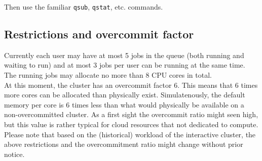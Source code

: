 \begin{prompt}
\end{prompt}

Then use the familiar \lstinline|qsub|, \lstinline|qstat|, etc. commands.

\subsection{Restrictions and overcommit factor}
\label{subsec:interactive_ugent_restrictions}

Currently each user may have at most 5 jobs in the queue (both running and waiting to run)
and at most 3 jobs per user can be running at the same time. The running jobs may allocate 
no more than 8 CPU cores in total. \\
At this moment, the cluster has an overcommit factor 6. This means that 6 times more cores
can be allocated than physically exist. Simulatenously, the default memory per core is 6
times less than what would physically be available on a non-overcommitted cluster. 
As a first sight the overcommit ratio might seen high, but this value is rather typical
for cloud resources that not dedicated to compute. \\
Please note that based on the (historical) workload of the interactive cluster, the above
restrictions and the overcommitment ratio might change without prior notice.
